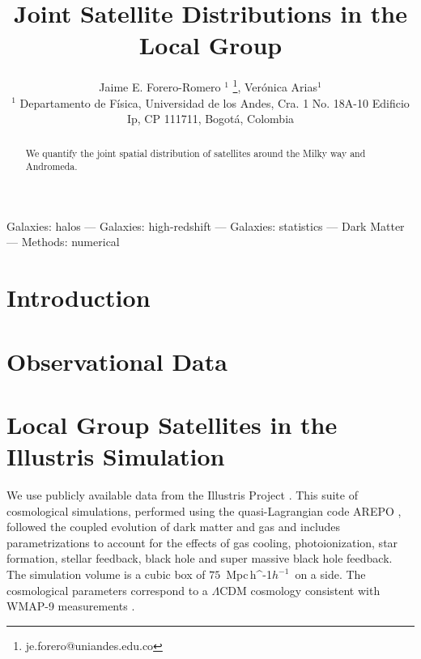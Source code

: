 \documentclass[a4paper,fleqn,usenatbib]{mnras}
\newcommand{\Mpch}{\,{\rm Mpc}\,\ifmmode h^{-1}\else $h^{-1}$\fi}
\begin{document}
\title[Satellites in the MW and M31]{Joint Satellite Distributions in
  the Local Group}
\author[J.E. Forero-Romero \& V. Arias]
{Jaime E. Forero-Romero $^{1}$ \thanks{je.forero@uniandes.edu.co},
Ver\'onica Arias$^1$\\
$^1$ Departamento de F\'isica, Universidad de los Andes, Cra. 1
  No. 18A-10 Edificio Ip, CP 111711, Bogot\'a, Colombia \\
}

\maketitle

\begin{abstract}
We quantify the joint spatial distribution of satellites around the Milky way and Andromeda.
\end{abstract}

\begin{keywords}Galaxies: halos --- Galaxies: high-redshift --- Galaxies: statistics
--- Dark Matter --- Methods: numerical 
\end{keywords}

\section{Introduction}

\section{Observational Data}
\label{sec:obs}


\section{Local Group Satellites in the Illustris Simulation}
\label{sec:NumericalSetup}

We use publicly available data from the Illustris Project 
\citep{2014MNRAS.444.1518V}. 
This suite of cosmological simulations, performed using the quasi-Lagrangian
code AREPO \citep{2010MNRAS.401..791S}, followed the coupled evolution of dark 
matter and gas and includes parametrizations to account for the effects of
gas cooling, photoionization, star formation, stellar feedback, black
hole and super massive black hole feedback. 
The simulation volume is a cubic box of $75$ \Mpch\ on a side.
The cosmological parameters correspond to a $\Lambda$CDM cosmology
consistent with WMAP-9 measurements \citep{2013ApJS..208...19H}. 
\end{document}
